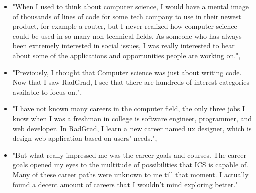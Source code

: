 \documentclass[acmsmall,nonacm]{acmart}
\begin{document}
\begin{itemize}[leftmargin=*]
\item "When I used to think about computer science, I would have a mental image of thousands of lines of code for some tech company to use in their newest product, for example a router, but I never realized how computer science could be used in so many non-technical fields. As someone who has always been extremely interested in social issues, I was really interested to hear about some of the applications and opportunities people are working on.",
\item "Previously, I thought that Computer science was just about writing code. Now that I saw RadGrad, I see that there are hundreds of interest categories available to focus on.",
\item "I have not known many careers in the computer field, the only three jobs I know when I was a freshman in college is software engineer, programmer, and web developer. In RadGrad, I learn a new career named ux designer, which is design web application based on users’ needs.",
\item "But what really impressed me was the career goals and courses. The career goals opened my eyes to the multitude of possibilities that ICS is capable of. Many of these career paths were unknown to me till that moment. I actually found a decent amount of careers that I wouldn’t mind exploring better."
\end{itemize}
\end{document}
